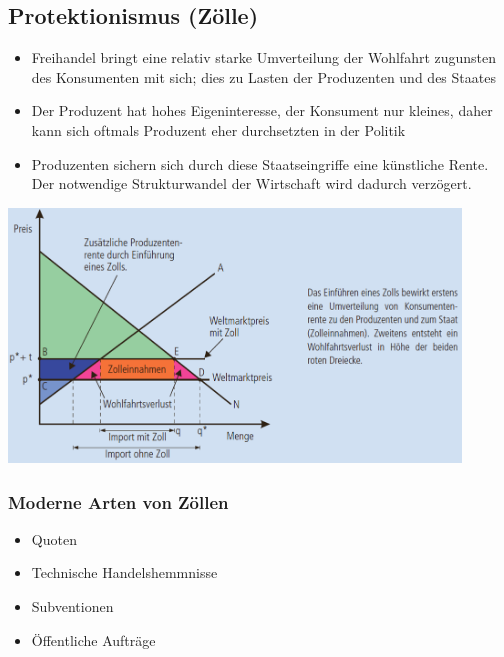 \subsection{Protektionismus (Zölle)}
\begin{minipage}{7cm}
	\begin{itemize}
		\item Freihandel bringt eine relativ starke Umverteilung der Wohlfahrt zugunsten des Konsumenten mit sich; dies zu Lasten der Produzenten und des Staates
		\item Der Produzent hat hohes Eigeninteresse, der Konsument nur kleines, daher kann sich oftmals Produzent eher durchsetzten in der Politik
		\item Produzenten sichern sich durch diese Staatseingriffe eine künstliche Rente. Der notwendige Strukturwandel der Wirtschaft wird dadurch verzögert.
	\end{itemize}
\end{minipage}
\begin{minipage}{12cm}
		\includegraphics[width=12cm]{images/zolle.png}
\end{minipage}
\subsubsection{Moderne Arten von Zöllen}
\begin{itemize}
	\item Quoten
	\item Technische Handelshemmnisse
	\item Subventionen
	\item Öffentliche Aufträge
\end{itemize}
